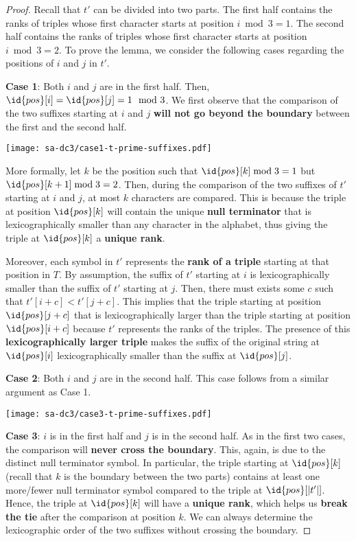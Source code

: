 \begin{proof}
    Recall that $t'$ can be divided into two parts. The first half contains the ranks of triples whose first character starts at position $i \bmod 3 = 1$. The second half contains the ranks of triples whose first character starts at position $i \bmod 3 = 2$. To prove the lemma, we consider the following cases regarding the positions of $i$ and $j$ in $t'$.

    \textbf{Case 1}: Both $i$ and $j$ are in the first half. Then, $\id{pos}[i] = \id{pos}[j] = 1 \mod 3$. We first observe that the comparison of the two suffixes starting at $i$ and $j$ \textbf{will not go beyond the boundary} between the first and the second half.
    \begin{marginfigure}
        \texttt{[image: sa-dc3/case1-t-prime-suffixes.pdf]}
    \end{marginfigure}
    More formally, let $k$ be the position such that $\id{pos}[k] \bmod 3 = 1$ but $\id{pos}[k+1] \bmod 3 = 2$. Then, during the comparison of the two suffixes of $t'$ starting at $i$ and $j$, at most $k$ characters are compared. This is because the triple at position $\id{pos}[k]$ will contain the unique \textbf{null terminator} that is lexicographically smaller than any character in the alphabet, thus giving the triple at $\id{pos}[k]$ a \textbf{unique rank}.

    Moreover, each symbol in $t'$ represents the \textbf{rank of a triple} starting at that position in $T$. By assumption, the suffix of $t'$ starting at $i$ is lexicographically smaller than the suffix of $t'$ starting at $j$. Then, there must exists some $c$ such that $t'[i+c] < t'[j+c]$. This implies that the triple starting at position $\id{pos}[j+c]$ that is lexicographically larger than the triple starting at position $\id{pos}[i+c]$ because $t'$ represents the ranks of the triples. The presence of this \textbf{lexicographically larger triple} makes the suffix of the original string at $\id{pos}[i]$ lexicographically smaller than the suffix at $\id{pos}[j]$.
    
    \textbf{Case 2}: Both $i$ and $j$ are in the second half. This case follows from a similar argument as Case 1.

    \begin{marginfigure}
        \texttt{[image: sa-dc3/case3-t-prime-suffixes.pdf]}
    \end{marginfigure}

    \textbf{Case 3}: $i$ is in the first half and $j$ is in the second half. As in the first two cases, the comparison will \textbf{never cross the boundary}. This, again, is due to the distinct null terminator symbol. In particular, the triple starting at $\id{pos}[k]$ (recall that $k$ is the boundary between the two parts) contains at least one more/fewer null terminator symbol compared to the triple at $\id{pos}[|t'|]$. Hence, the triple at $\id{pos}[k]$ will have a \textbf{unique rank}, which helps us \textbf{break the tie} after the comparison at position $k$. We can always determine the lexicographic order of the two suffixes without crossing the boundary.


\end{proof}
